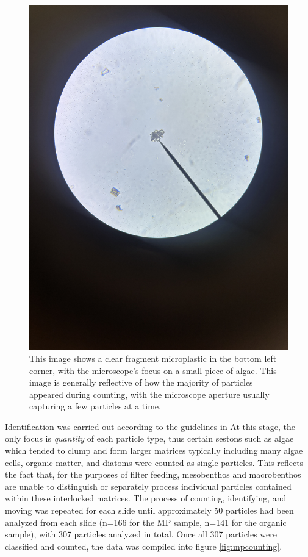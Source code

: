 \documentclass[fleqn,10pt]{SelfArx} %
\begin{document}
	\begin{figure}[h]
		\centering
		\includegraphics[width=1\linewidth]{Figures/MPOrganic}
		\caption[MP Near Organic Matter]{This image shows a clear fragment microplastic in the bottom left corner, with the microscope's focus on a small piece of algae. This image is generally reflective of how the majority of particles appeared during counting, with the microscope aperture usually capturing a few particles at a time.}
		\label{fig:mporganic}
	\end{figure}
	Identification was carried out according to the guidelines in \cite{Huang_Hu_Wang_2022} At this stage, the only focus is \emph{quantity} of each particle type, thus certain \glspl{seston} such as algae which tended to clump and form larger matrices typically including many algae cells, organic matter, and diatoms were counted as single particles. This reflects the fact that, for the purposes of filter feeding, mesobenthos and macrobenthos are unable to distinguish or separately process individual particles contained within these interlocked matrices. The process of counting, identifying, and moving was repeated for each slide until approximately 50 particles had been analyzed from each slide (n=166 for the MP sample, n=141 for the organic sample), with 307 particles analyzed in total. Once all 307 particles were classified and counted, the data was compiled into figure \ref{fig:mpcounting}.
\end{document}
